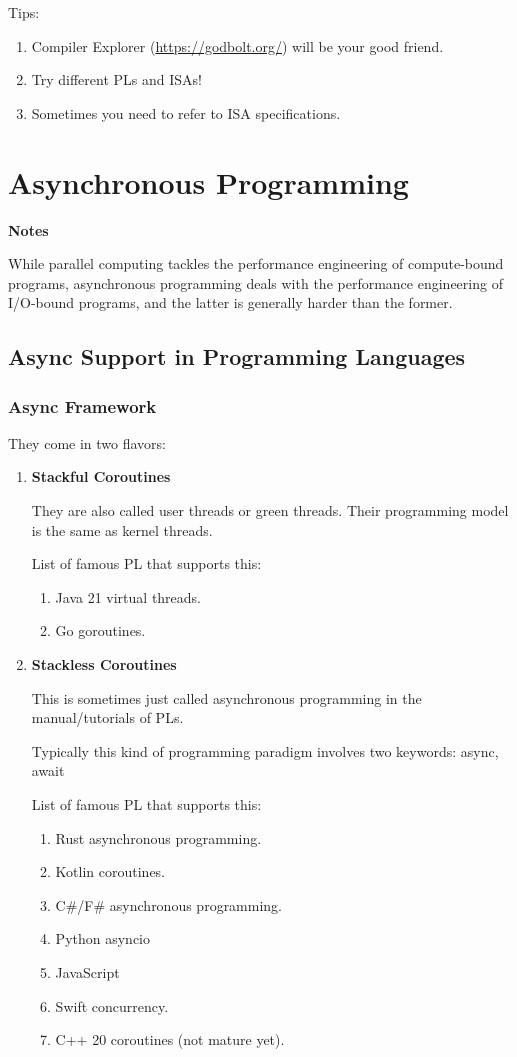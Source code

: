 \documentclass{article}
\begin{document}
Tips:
\begin{enumerate}
    \item Compiler Explorer (\href{https://godbolt.org/}{https://godbolt.org/}) will be your good friend.
    \item Try different PLs and ISAs!
    \item Sometimes you need to refer to ISA specifications.
\end{enumerate}

\section{Asynchronous Programming}
\textbf{Notes}

\noindent
While parallel computing tackles the performance engineering of compute-bound programs, asynchronous programming deals with the performance engineering of I/O-bound programs, and the latter is generally harder than the former.

\subsection{Async Support in Programming Languages}

\subsubsection{Async Framework}
They come in two flavors:
\begin{enumerate}
    \item \textbf{Stackful Coroutines}

    They are also called user threads or green threads.
    Their programming model is the same as kernel threads.
    
    List of famous PL that supports this:
    \begin{enumerate}
        \item Java 21 virtual threads.
        \item Go goroutines.
    \end{enumerate}
    \item \textbf{Stackless Coroutines}
    
    This is sometimes just called asynchronous programming in the manual/tutorials of PLs.

    Typically this kind of programming paradigm involves two keywords:
    async, await

    List of famous PL that supports this:
    \begin{enumerate}
        \item Rust asynchronous programming.
        \item Kotlin coroutines.
        \item C\#/F\# asynchronous programming.
        \item Python asyncio
        \item JavaScript
        \item Swift concurrency.
        \item C++ 20 coroutines (not mature yet).
    \end{enumerate}
\end{enumerate}
\end{document}
